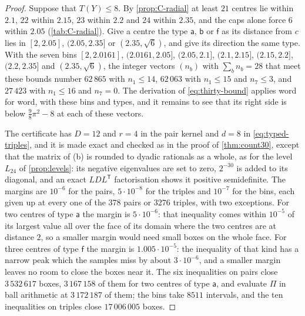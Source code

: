 \documentclass[11pt,reqno]{amsart}
\renewcommand{\_}{\origunderscore\allowbreak}
\numberwithin{equation}{section}
\theoremstyle{plain}
\theoremstyle{definition}
\theoremstyle{remark}
\begin{document}
\begin{proof}
Suppose that $T(Y)\le8$. By \cref{prop:C-radial} at least $21$ centres lie
within $2.1$, $22$ within $2.15$, $23$ within $2.2$ and $24$ within $2.35$,
and the caps alone force $6$ within $2.05$ (\cref{tab:C-radial}). Give a
centre the type $\mathsf a$, $\mathsf b$ or $\mathsf f$ as its distance from
$c$ lies in $[2,2.05]$, $(2.05,2.35]$ or $(2.35,\sqrt6)$, and give its
direction the same type. With the seven bins $[2,2.0161]$, $(2.0161,2.05]$,
$(2.05,2.1]$, $(2.1,2.15]$, $(2.15,2.2]$, $(2.2,2.35]$ and $(2.35,\sqrt6)$,
the integer vectors $(n_b)$ with $\sum_bn_b=28$ that meet these bounds
number $62\,865$ with $n_1\le14$, $62\,063$ with $n_1\le15$ and $n_7\le3$, and
$27\,423$ with $n_1\le16$ and $n_7=0$.
The derivation of
\eqref{eq:thirty-bound} applies word for word, with these bins and types,
and it remains to see that its right side is below $\frac98\pi^2-8$ at each
of these vectors.

The certificate has $D=12$ and $r=4$ in the pair kernel and $d=8$ in
\eqref{eq:typed-triples}, and it is made exact and checked as in the proof
of \cref{thm:count30}, except that the matrix of (b) is rounded to dyadic
rationals as a whole, as for the level $L_{24}$ of \cref{prop:levels}: its
negative eigenvalues are set to zero, $2^{-30}$ is added to its diagonal,
and an exact $LDL^{\mathsf T}$ factorisation shows it positive
semidefinite. The margins are
$10^{-6}$ for the pairs, $5\cdot10^{-8}$ for the triples and
$10^{-7}$ for the bins, each given up at every one of the $378$ pairs or
$3276$ triples, with two exceptions. For two centres of type $\mathsf a$ the
margin is $5\cdot10^{-6}$: that inequality comes within $10^{-5}$ of its
largest value all over the face of its domain where the two centres are at
distance $2$, so a smaller margin would need small boxes on the whole face.
For three centres of type $\mathsf f$ the margin is $1.005\cdot10^{-5}$: the
inequality of that kind has a narrow peak which the samples miss by about
$3\cdot10^{-6}$, and a smaller margin leaves no room to close the boxes near
it. The six inequalities on pairs close $3\,532\,617$ boxes, $3\,167\,158$ of them for two
centres of type $\mathsf a$, and evaluate $\Pi$ in ball arithmetic at
$3\,172\,187$ of them; the bins take $8511$ intervals, and the ten inequalities on
triples close $17\,006\,005$ boxes.


\end{proof}
\end{document}
